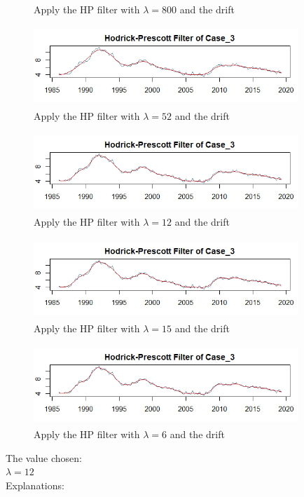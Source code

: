 \documentclass[10pt]{article}
\begin{document}
\begin{enumerate}[1)]
\begin{figure}[H]
  \caption{Apply the HP filter with $\lambda=800$ and the drift}
\end{figure}
\begin{figure}[H]
  \centering
  \includegraphics[width=10cm,height=3cm]{p17g.jpeg}
  \caption{Apply the HP filter with $\lambda=52$ and the drift}
\end{figure}
\begin{figure}[H]
  \centering
  \includegraphics[width=10cm,height=3cm]{p17h.jpeg}
  \caption{Apply the HP filter with $\lambda=12$ and the drift}
\end{figure}
\begin{figure}[H]
  \centering
  \includegraphics[width=10cm,height=3cm]{p17i.jpeg}
  \caption{Apply the HP filter with $\lambda=15$ and the drift}
\end{figure}
\begin{figure}[H]
  \centering
  \includegraphics[width=10cm,height=3cm]{p17j.jpeg}
  \caption{Apply the HP filter with $\lambda=6$ and the drift}
\end{figure}
\vspace{3mm}
The value chosen:\\
$\lambda=12$\\
Explanations:\\

\end{enumerate}
\end{document}
